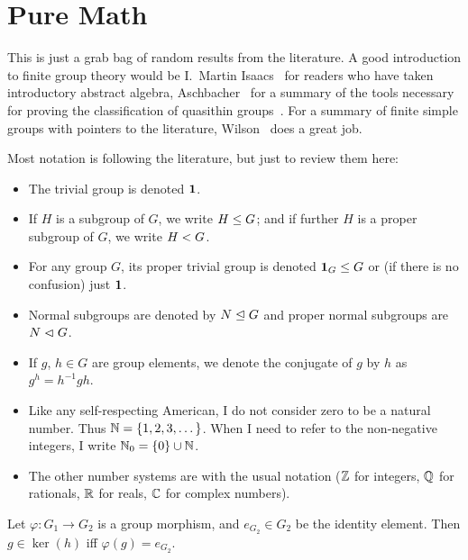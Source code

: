 \chapter{Pure Math}\label{chapter:pure-math}

This is just a grab bag of random results from the literature. A good
introduction to finite group theory would be I.~Martin
Isaacs~\cite{isaacs2008finite} for readers who have taken introductory
abstract algebra, Aschbacher~\cite{aschbacher2000finite} for a summary
of the tools necessary for proving the classification of quasithin groups~\cite{aschbacher2004classification1,aschbacher2004classification2}.
For a summary of finite simple groups with pointers to the literature,
Wilson~\cite{wilson2009finite} does a great job.


\begin{notation}
Most notation is following the literature, but just to
review them here:
\begin{itemize}%
\item The trivial group is denoted $\mathbf{1}$.
\item If $H$ is a subgroup of $G$, we write $H\leq G$; and if
  further $H$ is a proper subgroup of $G$, we write $H< G$.
\item For any group $G$, its proper trivial group is denoted
  $\mathbf{1}_{G}\leq G$ or (if there is no confusion) just
  $\mathbf{1}$.
\item Normal subgroups are denoted by $N\trianglelefteq G$ and proper
  normal subgroups are $N\mathrel{\lhd} G$.
\item If $g$, $h\in G$ are group elements, we denote the conjugate of $g$ by
$h$ as $g^{h}=h^{-1}gh$.
\item Like any self-respecting American, I do not consider zero to be a
natural number. Thus $\mathbb{N}=\{1,2,3,\dots\}$. When I need to refer to the
non-negative integers, I write $\mathbb{N}_{0}=\{0\}\cup\mathbb{N}$.
\item The other number systems are with the usual notation ($\mathbb{Z}$ for
  integers, $\mathbb{Q}$ for rationals, $\mathbb{R}$ for reals, $\mathbb{C}$ for complex numbers).
\end{itemize}
\end{notation}

\begin{theorem}
  Let $\varphi\colon G_{1}\to G_{2}$ is a group morphism, and
  $e_{G_{2}}\in G_{2}$ be the identity element.
  Then $g\in\ker(h)$ iff $\varphi(g)=e_{G_{2}}$.
\end{theorem}

